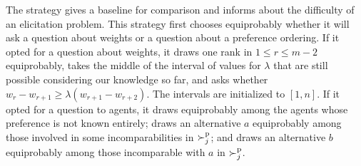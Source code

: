 \documentclass[sigconf, anonymous]{aamas}
\begin{document}
The  strategy gives a baseline for comparison and informs about the difficulty of an elicitation problem. 
This strategy first chooses equiprobably whether it will ask a question about weights or a question about a preference ordering. If it opted for a question about weights, it draws one rank in $1 ≤ r ≤ m-2$ equiprobably, takes the middle of the interval of values for $\lambda$ that are still possible considering our knowledge so far, and asks whether $w_r - w_{r+1} ≥ \lambda (w_{r+1} - w_{r+2})$. The intervals are initialized to $[1, n]$. If it opted for a question to agents, it draws equiprobably among the agents whose preference is not known entirely; draws an alternative $a$ equiprobably among those involved in some incomparabilities in $\succ^\text{p}_j$; and draws an alternative $b$ equiprobably among those incomparable with $a$ in $\succ^\text{p}_j$.
\end{document}

